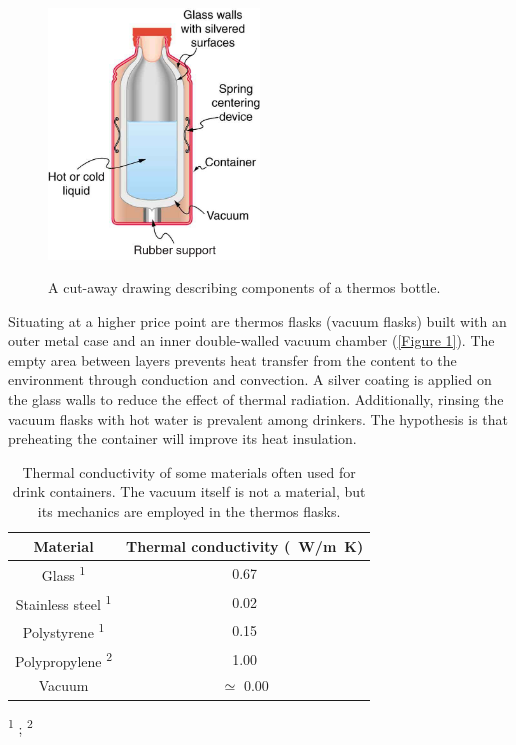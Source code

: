 \documentclass[11pt]{article}
\begin{document}
\begin{figure}[h!]
	\centering
	\caption{A cut-away drawing describing components of a thermos bottle. \citep{SamuelJ.LingWilliamMoebs2016}}
	\includegraphics[width=0.5\textwidth,height=0.375\textheight]{Tdiagram}
	\label{Figure 1}
\end{figure}

\pagebreak

Situating at a higher price point are thermos flasks (vacuum flasks) built with an outer metal case and an inner double-walled vacuum chamber (\autoref{Figure 1}). The empty area between layers prevents heat transfer from the content to the environment through conduction and convection. A silver coating is applied on the glass walls to reduce the effect of thermal radiation. Additionally, rinsing the vacuum flasks with hot water is prevalent among drinkers. The hypothesis is that preheating the container will improve its heat insulation.

\begin{table}[h!]
	\centering
	\begin{threeparttable}
		\caption{Thermal conductivity of some materials often used for drink containers. The vacuum itself is not a material, but its mechanics are employed in the thermos flasks.}
		\label{Table 1}
		\begin{tabular*}{\textwidth}{ @{\extracolsep{\fill}} cc}
			\toprule
			Material & Thermal conductivity (\SI{}{W/m.K}) \\
			\midrule 
			Glass \textsuperscript{1} 				  & 0.67    \\
			Stainless steel \textsuperscript{1}  	  & 0.02    \\
			Polystyrene \textsuperscript{1}  			  & 0.15    \\
			Polypropylene \textsuperscript{2}   	  & 1.00    \\
			Vacuum    				  & $\simeq$ 0.00	\\
			\bottomrule
		\end{tabular*}
		\begin{tablenotes}
			\footnotesize
			\centering
			\item \textsuperscript{1} \citep{Young1992}; \textsuperscript{2} \citep{Patti2020}
		\end{tablenotes}
	\end{threeparttable}
\end{table} 
\end{document}
